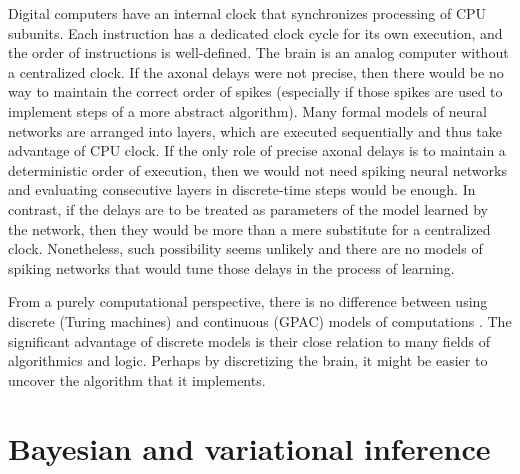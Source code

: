 \documentclass[oneside,english,logo]{amuthesis}
\begin{document}
Digital computers have an internal clock that synchronizes processing of CPU subunits. Each instruction has a dedicated clock cycle for its own execution, and the order of instructions is well-defined. The brain is an analog computer without a centralized clock. If the axonal delays were not precise, then there would be no way to maintain the correct order of spikes (especially if those spikes are used to implement steps of a more abstract algorithm). Many formal models of neural networks are arranged into layers, which are executed sequentially and thus take advantage of CPU clock. If the only role of precise axonal delays is to maintain a deterministic order of execution, then we would not need spiking neural networks and evaluating consecutive layers in discrete-time steps would be enough. In contrast, if the delays are to be treated as parameters of the model learned by the network, then they would be more than a mere substitute for a centralized clock. Nonetheless, such possibility seems unlikely and there are no models of spiking networks that would tune those delays in the process of learning. 

From a purely computational perspective, there is no difference between using discrete (Turing machines) and continuous (GPAC) models of computations \cite{BOURNEZ2007317,Bournez2008}. The significant advantage of discrete models is their close relation to many fields of algorithmics and logic. Perhaps by discretizing the brain, it might be easier to uncover the algorithm that it implements. 


\section{Bayesian and variational inference}
\end{document}
